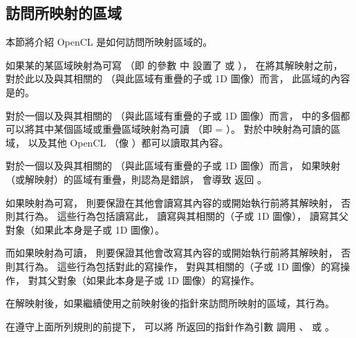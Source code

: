 \subsection{訪問所映射的區域}

本節將介紹 OpenCL 是如何訪問所映射區域的。

如果某的某區域映射為可寫
（即  的參數  中
設置了  或  ），
在將其解映射之前，
對於此以及與其相關的
（與此區域有重疊的子或 1D 圖像）而言，
此區域的內容是的。

對於一個以及與其相關的
（與此區域有重疊的子或 1D 圖像）而言，
中的多個都可以將其中某個區域或重疊區域映射為可讀
（即  = ）。
對於中映射為可讀的區域，
以及其他 OpenCL （像 ）都可以讀取其內容。

對於一個以及與其相關的
（與此區域有重疊的子或 1D 圖像）而言，
如果映射（或解映射）的區域有重疊，則認為是錯誤，
會導致  返回 。

如果映射為可寫，
則要保證在其他會讀寫其內容的或開始執行前將其解映射，
否則其行為。
這些行為包括讀寫此，
讀寫與其相關的（子或 1D 圖像），
讀寫其父對象（如果此本身是子或 1D 圖像）。

而如果映射為可讀，
則要保證其他會改寫其內容的或開始執行前將其解映射，
否則其行為。
這些行為包括對此的寫操作，
對與其相關的（子或 1D 圖像）的寫操作，
對其父對象（如果此本身是子或 1D 圖像）的寫操作。

在解映射後，如果繼續使用之前映射後的指針來訪問所映射的區域，其行為。

在遵守上面所列規則的前提下，
可以將  所返回的指針作為引數  調用
、
或 。
